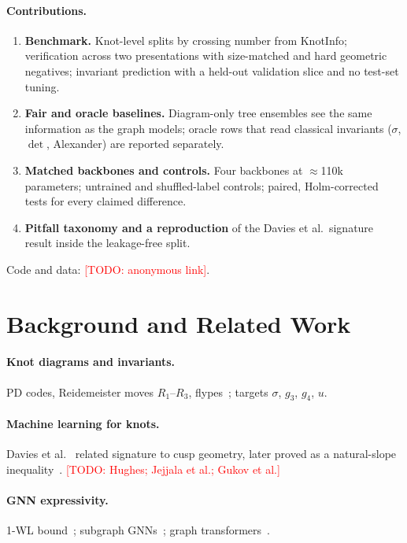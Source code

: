 \documentclass{article}
\newcommand{\todo}[1]{\textcolor{red}{[TODO: #1]}}
\newif\ifmaintrack \maintrackfalse
\begin{document}
\paragraph{Contributions.}
\begin{enumerate}[leftmargin=*,itemsep=2pt]
  \item \textbf{Benchmark.} Knot-level splits by crossing number from KnotInfo;
        verification across two presentations with size-matched and hard
        geometric negatives; invariant prediction with a held-out validation
        slice and no test-set tuning.
  \item \textbf{Fair and oracle baselines.} Diagram-only tree ensembles see the
        same information as the graph models; oracle rows that read classical
        invariants ($\sigma$, $\det$, Alexander) are reported separately.
  \item \textbf{Matched backbones and controls.} Four backbones at
        $\approx$110k parameters; untrained and shuffled-label controls;
        paired, Holm-corrected tests for every claimed difference.
  \item \textbf{Pitfall taxonomy and a reproduction} of the Davies et al.\
        signature result inside the leakage-free split.
  \ifmaintrack
  \item \textbf{Method.} \todo{non-local architecture}
  \fi
\end{enumerate}
Code and data: \todo{anonymous link}.

\section{Background and Related Work}\label{sec:related}
\paragraph{Knot diagrams and invariants.} PD codes, Reidemeister moves
$R_1$--$R_3$, flypes~\cite{menasco1993classification}; targets $\sigma$, $g_3$,
$g_4$, $u$.
\paragraph{Machine learning for knots.} Davies et al.~\cite{davies2021advancing}
related signature to cusp geometry, later proved as a natural-slope
inequality~\cite{davies2022signature}. \todo{Hughes; Jejjala et al.; Gukov et al.}
\paragraph{GNN expressivity.} 1-WL bound~\cite{xu2019powerful}; subgraph
GNNs~\cite{bevilacqua2022equivariant}; graph transformers~\cite{rampasek2022gps}.
\end{document}
